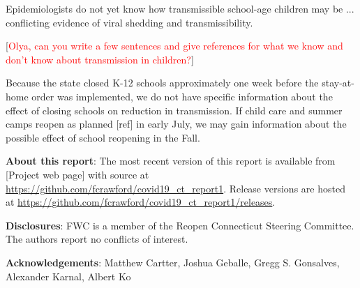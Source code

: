 \documentclass[11pt]{article}
\newcommand{\comment}[1]{[\textcolor{red}{#1}]}
\begin{document}
Epidemiologists do not yet know how transmissible school-age children may be ... conflicting evidence of viral shedding and transmissibility. 

\comment{Olya, can you write a few sentences and give references for what we know and don't know about transmission in children?}

Because the state closed K-12 schools approximately one week before the stay-at-home order was implemented, we do not have specific information about the effect of closing schools on reduction in transmission.  If child care and summer camps reopen as planned [ref] in early July, we may gain information about the possible effect of school reopening in the Fall.  



\textbf{About this report}: The most recent version of this report is available from [Project web page] with source at \url{https://github.com/fcrawford/covid19_ct_report1}. Release versions are hosted at \url{https://github.com/fcrawford/covid19_ct_report1/releases}. 



\textbf{Disclosures}: FWC is a member of the Reopen Connecticut Steering Committee.  The authors report no conflicts of interest. 



\textbf{Acknowledgements}:
Matthew Cartter,
Joshua Geballe,
Gregg S. Gonsalves,
Alexander Karnal,
Albert Ko 






\end{document}
